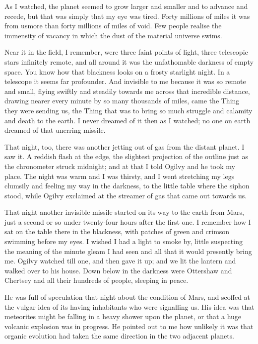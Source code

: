As I watched, the planet seemed to grow larger and smaller and to
advance and recede, but that was simply that my eye was tired.
Forty millions of miles it was from us\dash{}more than forty millions of
miles of void. Few people realise the immensity of vacancy in which
the dust of the material universe swims.

Near it in the field, I remember, were three faint points of light,
three telescopic stars infinitely remote, and all around it was the
unfathomable darkness of empty space. You know how that blackness
looks on a frosty starlight night. In a telescope it seems far
profounder. And invisible to me because it was so remote and small,
flying swiftly and steadily towards me across that incredible
distance, drawing nearer every minute by so many thousands of
miles, came the Thing they were sending us, the Thing that was to
bring so much struggle and calamity and death to the earth. I never
dreamed of it then as I watched; no one on earth dreamed of that
unerring missile.

That night, too, there was another jetting out of gas from the
distant planet. I saw it. A reddish flash at the edge, the
slightest projection of the outline just as the chronometer struck
midnight; and at that I told Ogilvy and he took my place. The night
was warm and I was thirsty, and I went stretching my legs clumsily
and feeling my way in the darkness, to the little table where the
siphon stood, while Ogilvy exclaimed at the streamer of gas that
came out towards us.

That night another invisible missile started on its way to the
earth from Mars, just a second or so under twenty-four hours after
the first one. I remember how I sat on the table there in the
blackness, with patches of green and crimson swimming before my
eyes. I wished I had a light to smoke by, little suspecting the
meaning of the minute gleam I had seen and all that it would
presently bring me. Ogilvy watched till one, and then gave it up;
and we lit the lantern and walked over to his house. Down below in
the darkness were Ottershaw and Chertsey and all their hundreds of
people, sleeping in peace.

He was full of speculation that night about the condition of Mars,
and scoffed at the vulgar idea of its having inhabitants who were
signalling us. His idea was that meteorites might be falling in a
heavy shower upon the planet, or that a huge volcanic explosion was
in progress. He pointed out to me how unlikely it was that organic
evolution had taken the same direction in the two adjacent
planets.

